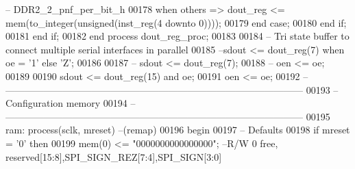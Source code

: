 \begin{DoxyCode}
{      -- DDR2\_2\_pnf\_per\_bit\_h}
00178                     \textcolor{keywordflow}{when} \textcolor{keywordflow}{others} \textcolor{vhdlchar}{=}\textcolor{vhdlchar}{>} \textcolor{vhdlchar}{dout_reg} \textcolor{vhdlchar}{<=} \textcolor{vhdlchar}{mem}\textcolor{vhdlchar}{(}\textcolor{vhdlchar}{to\_integer}\textcolor{vhdlchar}{(}\textcolor{comment}{unsigned}\textcolor{vhdlchar}{(}\textcolor{vhdlchar}{inst_reg}\textcolor{vhdlchar}{(}\textcolor{vhdllogic}{}\textcolor{vhdllogic}{4} \textcolor{keywordflow}{downto} \textcolor{vhdllogic}{}\textcolor{vhdllogic}{0}\textcolor{vhdlchar}{)}\textcolor{vhdlchar}{)}\textcolor{vhdlchar}{)}\textcolor{vhdlchar}{)};
00179                 \textcolor{keywordflow}{end} \textcolor{keywordflow}{case};
00180             \textcolor{keywordflow}{end} \textcolor{keywordflow}{if};               
00181         \textcolor{keywordflow}{end} \textcolor{keywordflow}{if};
00182     \textcolor{keywordflow}{end} \textcolor{keywordflow}{process} \textcolor{vhdlchar}{dout\_reg\_proc};
00183     
00184 \textcolor{keyword}{    -- Tri state buffer to connect multiple serial interfaces in parallel}
00185 \textcolor{keyword}{    --sdout <= dout\_reg(7) when oe = '1' else 'Z';}
00186 
00187 \textcolor{keyword}{--  sdout <= dout\_reg(7);}
00188 \textcolor{keyword}{--  oen <= oe;}
00189 
00190     \textcolor{vhdlchar}{sdout} \textcolor{vhdlchar}{<=} \textcolor{vhdlchar}{dout_reg}\textcolor{vhdlchar}{(}\textcolor{vhdllogic}{}\textcolor{vhdllogic}{15}\textcolor{vhdlchar}{)} \textcolor{keywordflow}{and} \textcolor{vhdlchar}{oe};
00191     \textcolor{vhdlchar}{oen} \textcolor{vhdlchar}{<=} \textcolor{vhdlchar}{oe};
00192 \textcolor{keyword}{    -- ---------------------------------------------------------------------------------------------}
00193 \textcolor{keyword}{    -- Configuration memory}
00194 \textcolor{keyword}{    -- --------------------------------------------------------------------------------------------- }
00195     ram: \textcolor{keywordflow}{process}(sclk, mreset)\textcolor{keyword}{ --(remap)}
00196 \textcolor{vhdlkeyword}{    begin}
00197 \textcolor{keyword}{        -- Defaults}
00198         \textcolor{keywordflow}{if} \textcolor{vhdlchar}{mreset} \textcolor{vhdlchar}{=} \textcolor{vhdlchar}{'}\textcolor{vhdllogic}{}\textcolor{vhdllogic}{0}\textcolor{vhdlchar}{'} \textcolor{keywordflow}{then}     
00199             \textcolor{vhdlchar}{mem}\textcolor{vhdlchar}{(}\textcolor{vhdllogic}{}\textcolor{vhdllogic}{0}\textcolor{vhdlchar}{)}  \textcolor{vhdlchar}{<=} \textcolor{vhdllogic}{"0000000000000000"};\textcolor{keyword}{ --R/W  0 free, reserved[15:8],SPI\_SIGN\_REZ[7:4],SPI\_SIGN[3:0]}

\end{DoxyCode}
